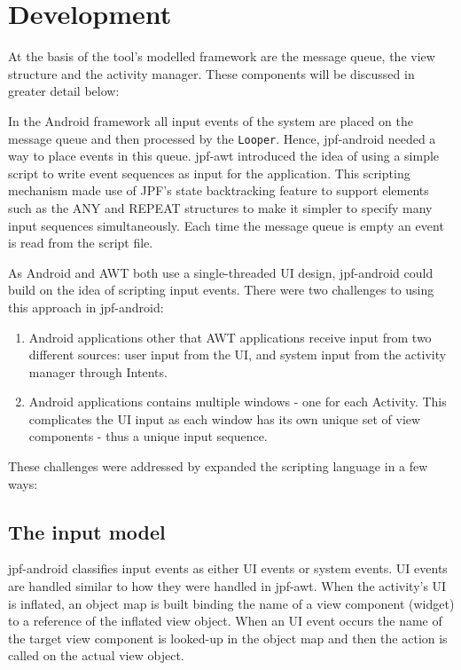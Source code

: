\documentclass{sig-alternate}
\begin{document}
\section{Development}
At the basis of the tool's modelled framework are the message queue, the view structure and the activity manager. These components will be
discussed in greater detail below:

In the Android framework all input events of the system are placed on the message queue and then processed by the \texttt{Looper}. Hence,
jpf-android needed a way to place events in this queue. jpf-awt introduced the idea of using a simple script to write event sequences as
input for the application. This scripting mechanism made use of JPF's state backtracking feature to support elements such as the ANY and
REPEAT structures to make it simpler to specify many input sequences simultaneously. Each time the message queue is empty an event is
read from the script file. 

As Android and AWT both use a single-threaded UI design, jpf-android could build on the idea of scripting input events. There were two
challenges to using this approach in jpf-android:
\begin{enumerate}
 \item Android applications other that AWT applications receive input from two different
sources: user input from the UI, and system input from the activity manager through Intents. 
 \item Android applications contains multiple windows - one for each Activity. This complicates the UI input as each
window has its own unique set of view components - thus a unique input sequence.
\end{enumerate}
These challenges were addressed by expanded the scripting language in a few ways:

\subsection{The input model}
jpf-android classifies input events as either UI events or system events. UI events are handled similar to
how they were handled in jpf-awt. When the activity's UI is inflated, an object map is built binding the name of a view component (widget)
to a reference of the inflated view object. When an UI event occurs the name of the target view component is looked-up in the object map
and then the action is called on the actual view object. 
\end{document}
